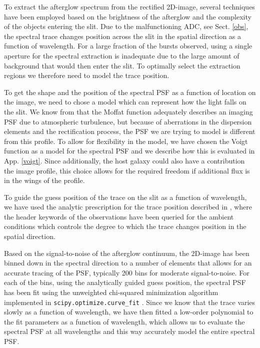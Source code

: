 \documentclass{aa}    %
\begin{document}
To extract the afterglow spectrum from the rectified 2D-image, several
techniques have been employed based on the brightness of the afterglow and the
complexity of the objects entering the slit. Due to the malfunctioning ADC, see
Sect. \ref{obs}, the spectral trace changes position across the slit in the
spatial direction as a function of wavelength. For a large fraction of the
bursts observed, using a single aperture for the spectral extraction is
inadequate due to the large amount of background that would then enter the slit.
To optimally select the extraction regions we therefore need to model the trace
position.

To get the shape and the position of the spectral PSF as a function of location
on the image, we need to chose a model which can represent how the light falls
on the slit. We know from \citet{Trujillo2001} that the Moffat function
\citep{Moffat1969} adequately describes an imaging PSF due to atmospheric
turbulence, but because of aberrations in the dispersion elements and the
rectification process, the PSF we are trying to model is different from this
profile. To allow for flexibility in the model, we have chosen the Voigt
function as a model for the spectral PSF and we describe how this is evaluated
in App. \ref{voigt}. Since additionally, the host galaxy could also have a
contribution the image profile, this choice allows for the required freedom if
additional flux is in the wings of the profile.

To guide the guess position of the trace on the slit as a function of
wavelength, we have used the analytic prescription for the trace position
described in \citet{Filippenko1982}, where the header keywords of the
observations have been queried for the ambient conditions which controls the
degree to which the trace changes position in the spatial direction.

Based on the signal-to-noise of the afterglow continuum, the 2D-image has been
binned down in the spectral direction to a number of elements that allows for an
accurate tracing of the PSF, typically 200 bins for moderate signal-to-noise.
For each of the bins, using the analytically guided guess position, the spectral
PSF has been fit using the unweighted chi-squared minimization algorithm
implemented in \texttt{scipy.optimize.curve\_fit} \citep{scipy}. Since we know
that the trace varies slowly as a function of wavelength, we have then fitted a
low-order polynomial to the fit parameters as a function of wavelength, which
allows us to evaluate the spectral PSF at all wavelengths and this way
accurately model the entire spectral PSF.
\end{document}

